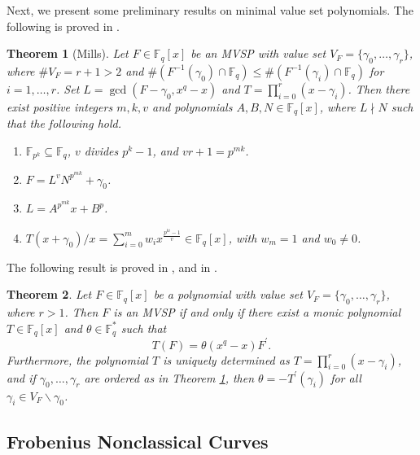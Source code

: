 \documentclass[11pt]{amsart}
\newcommand{\F}{\mathbb{F}}
\newtheorem{theorem}{Theorem}[section]
\theoremstyle{definition}
\theoremstyle{remark}
\begin{document}
Next, we present some preliminary results on minimal value set polynomials. The following is proved in \cite[Theorem 1]{Mills}. 

\begin{theorem}[Mills]\label{thm:mills}
Let $F\in \F_q[x]$ be an MVSP with value set $V_{F}=\{\gamma_0, \ldots, \gamma_r\}$, where $\# V_F=r+1>2$ and $\# (F^{-1}(\gamma_0)\cap \F_q)\le \# (F^{-1}(\gamma_i)\cap \F_q)$ for  $i=1,\ldots, r$. Set $L=\gcd(F-\gamma_0,x^q-x)$  and $T=\prod\limits_{i=0}^{r}(x-\gamma_i)$. Then there exist positive integers $m, k, v$  and polynomials $A, B, N\in \F_q[x]$, where $L\nmid N$  such that the following hold.
\begin{enumerate}[\rm(i)]
\item $\F_{p^k} \subseteq \F_q$, $v$ divides $p^{k}-1$, and $vr+1=p^{mk}$.
\item $F=L^vN^{p^{mk}}+\gamma_0$.
\item $L=A^{p^{mk}}x+B^p$.
\item $T(x+\gamma_0)/x=\sum\limits_{i=0}^{m}w_ix^{\frac{p^{ki}-1}{v}}  \in \F_q[x]$,  with $w_m=1$ and $w_0\ne 0$.
\end{enumerate}
\end{theorem}






The following result  is proved in  \cite[Theorem 3.1]{Bor2},  and in \cite[Lemma 2.4]{Bor1}.



\begin{theorem}\label{MillsBor}
Let $F \in \F_q[x]$ be a polynomial with value set $V_{F}=\{\gamma_0, \ldots, \gamma_r\}$, where $r>1$.
Then $F$ is an MVSP if and only if there exist a monic polynomial $T \in \F_q [x]$ and $\theta \in \F_q^*$ such that
\begin{equation}\label{MVSP}
T(F)=\theta(x^q-x)F^{\prime}.
\end{equation}
Furthermore, the polynomial $T$ is uniquely determined as $T=\prod\limits_{i=0}^{r}(x-\gamma_i)$, and if $\gamma_0, \ldots, \gamma_r$ are ordered as in Theorem
\ref{thm:mills}, then $\theta=-T^{\prime}\left(\gamma_{i}\right)$ for all $\gamma_{i} \in V_{F}\backslash {\gamma_0}$.
\end{theorem}


\subsection{Frobenius Nonclassical Curves}
\end{document}
